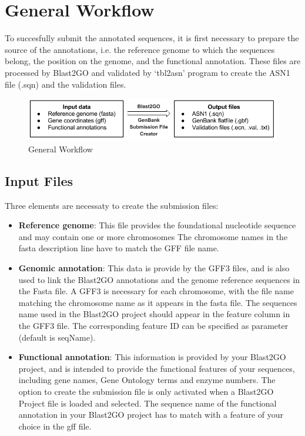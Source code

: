 \section{General Workflow}
To succesfully submit the annotated sequences, it is first necessary to prepare
the source of the annotations, i.e. the reference genome to
which the sequences belong, the position on the genome, and the functional
annotation. These files are processed by Blast2GO and validated by `tbl2asn'
program to create the ASN1 file (.sqn) and the validation files.

\begin{figure}[!h] \centering
\includegraphics[width=\textwidth]{img/Submission_workFlow.png}
\caption{General Workflow}
\label{fig:ncbisubworkflow}
\end{figure}
\newpage
\subsection{Input Files}
Three elements are necessaty to create the submission files:

\begin{itemize}
  \item \textbf{Reference genome}: This file provides the foundational
  nucleotide sequence and may contain one or more chromosomes The chromosome
  names in the fasta description line have to match the GFF file name.
  \item \textbf{Genomic annotation}: This data is provide by the GFF3 files, and
  is also used to link the Blast2GO annotations and the
  genome reference sequences in the Fasta file. A GFF3 is necessary for each
  chromosome, with the file name matching the chromosome name as it appears in
  the fasta file. The sequences name used in the Blast2GO project should appear
  in the feature column in the GFF3 file. The corresponding feature ID can be
  specified as parameter (default is seqName).
  \item \textbf{Functional annotation}: This information is provided by your
  Blast2GO project, and is intended to provide the functional features of your
  sequences, including gene names, Gene Ontology terms and enzyme numbers. The
  option to create the submission file is only activated when a Blast2GO
  Project file is loaded and selected.
  The sequence name of the functional annotation in your Blast2GO project has to
  match with a feature of your choice in the gff file.
\end{itemize}

